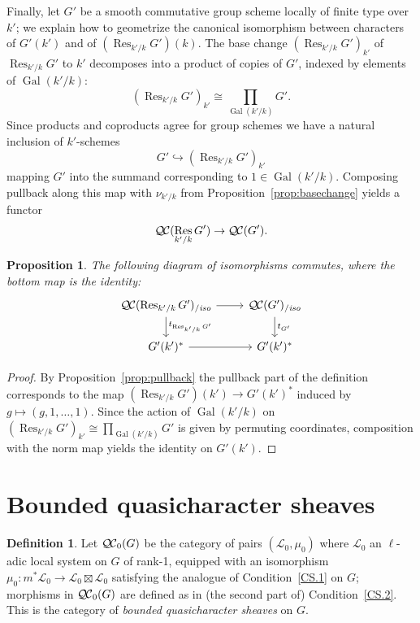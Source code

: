 \documentclass[11pt]{amsart}
\theoremstyle{plain}
\newtheorem{proposition}[theorem]{Proposition}
\theoremstyle{definition}
\newtheorem{definition}[theorem]{Definition}
\theoremstyle{remark}
\DeclareMathOperator{\Gal}{Gal}
\DeclareMathOperator{\Res}{Res}
\newcommand{\qcs}[1]{{\mathcal{#1}}}
\newcommand{\QC}{{\mathcal{Q\hskip-0.8pt C}}}
\newcommand{\QCb}{{\QC_0}}
\newcommand{\QCiso}[1]{\QC(#1)_{/\textit{iso}}}
\newcommand{\trFrob}[1]{t_{#1}}
\begin{document}
Finally, let $G'$ be a smooth commutative group scheme locally of finite type over $k'$;
we explain how to geometrize the canonical isomorphism between characters of $G'(k')$ and of $(\Res_{k'/k}G')(k)$.
The base change $(\Res_{k'/k}G')_{k'}$ of $\Res_{k'/k}G'$ to $k'$
decomposes into a product of copies of $G'$, indexed by elements of $\Gal(k'/k)$:
\[
(\Res_{k'/k}G')_{k'} \cong \prod_{\Gal(k'/k)} G'.
\]
Since products and coproducts agree for group schemes we have a natural inclusion of $k'$-schemes 
\[
G' \hookrightarrow (\Res_{k'/k}G')_{k'}
\]
mapping $G'$ into the summand corresponding to $1 \in \Gal(k'/k)$.  Composing pullback
along this map with $\nu_{k'/k}$ from Proposition~\ref{prop:basechange} yields a functor
\[
\QC(\Res_{k'/k}G') \to \QC(G').
\]

\begin{proposition}
The following diagram of isomorphisms commutes, where the bottom map is the identity:
\[
\begin{tikzcd}
\QCiso{\Res_{k'/k} G'} \dar{\trFrob{\Res_{k'/k} G'}} \rar & \QCiso{G'} \dar{\trFrob{G'}}\\
G'(k')^* \rar & G'(k')^*
\end{tikzcd}
\]
\end{proposition}
\begin{proof}
By Proposition~\ref{prop:pullback} the pullback part of the definition corresponds to the map $(\Res_{k'/k}G')(k') \to G'(k')^*$
induced by $g \mapsto (g, 1, \ldots, 1)$.  Since the action of $\Gal(k'/k)$ on $(\Res_{k'/k}G')_{k'} \cong \prod_{\Gal(k'/k)} G'$
is given by permuting coordinates, composition with the norm map yields the identity on $G'(k')$.
\end{proof}

\section{Bounded quasicharacter sheaves}\label{sec:bounded}

\begin{definition}
Let $\QCb(G)$ be the category of pairs $(\qcs{L}_0,\mu_0)$ 
where $\qcs{L}_0$ an $\ell$-adic local system on $G$ of rank-1, 
equipped with an isomorphism $\mu_0 : m^* \qcs{L}_0 \to \qcs{L}_0 \boxtimes \qcs{L}_0$ 
satisfying the analogue of Condition~\ref{CS.1} on $G$; 
morphisms in $\QCb(G)$ are defined as in (the second part of) Condition~\ref{CS.2}. 
This is the category of \emph{bounded quasicharacter sheaves} on $G$. 
\end{definition}
\end{document}
